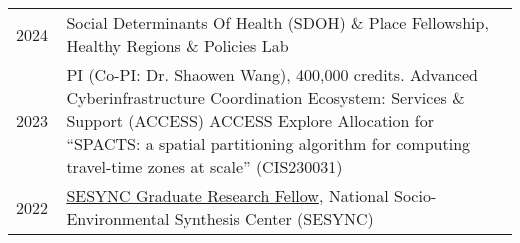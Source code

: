 \documentclass{acmcv}
\begin{document}

\begin{longtable}{p{0.1\linewidth} p{0.9\linewidth}}
    2024 & Social Determinants Of Health (SDOH) \& Place Fellowship, Healthy Regions \& Policies Lab \\

    2023 & PI (Co-PI: Dr. Shaowen Wang), 400,000 credits. Advanced Cyberinfrastructure Coordination Ecosystem: Services \& Support (ACCESS) \newline ACCESS Explore Allocation for “SPACTS: a spatial partitioning algorithm for computing travel-time zones at scale” (CIS230031) \\


    2022 & \href{https://www.sesync.org/project/graduate-pursuits-request-for-proposals/financial-opacity-and-challenges-to-forest}{SESYNC Graduate Research Fellow}, National Socio-Environmental Synthesis Center (SESYNC)\\

\end{longtable}


\end{document}
